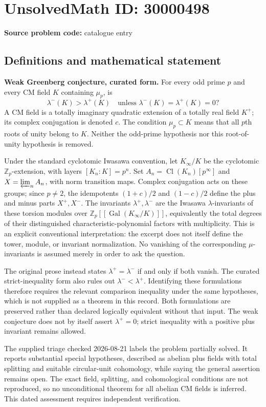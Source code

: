\documentclass[11pt]{article}
\newcommand{\Z}{\mathbb{Z}}
\begin{document}
\section*{UnsolvedMath ID: 30000498}
\textbf{Source problem code:} catalogue entry
\subsection{Definitions and mathematical statement}
\textbf{Weak Greenberg conjecture, curated form.} For every odd prime \(p\) and every CM field \(K\) containing \(\mu_p\), is\[\lambda^-(K)>\lambda^+(K)\quad\text{unless }\lambda^-(K)=\lambda^+(K)=0?\] A CM field is a totally imaginary quadratic extension of a totally real field \(K^+\); its complex conjugation is denoted \(c\). The condition \(\mu_p\subset K\) means that all \(p\)th roots of unity belong to \(K\). Neither the odd-prime hypothesis nor this root-of-unity hypothesis is removed.\par Under the standard cyclotomic Iwasawa convention, let \(K_\infty/K\) be the cyclotomic \(\Z_p\)-extension, with layers \([K_n:K]=p^n\). Set \(A_n=\operatorname{Cl}(K_n)[p^\infty]\) and \(X=\varprojlim_n A_n\), with norm transition maps. Complex conjugation acts on these groups; since \(p\ne2\), the idempotents \((1+c)/2\) and \((1-c)/2\) define the plus and minus parts \(X^+,X^-\). The invariants \(\lambda^+,\lambda^-\) are the Iwasawa \(\lambda\)-invariants of these torsion modules over \(\Z_p[[\operatorname{Gal}(K_\infty/K)]]\), equivalently the total degrees of their distinguished characteristic-polynomial factors with multiplicity. This is an explicit conventional interpretation: the excerpt does not itself define the tower, module, or invariant normalization. No vanishing of the corresponding \(\mu\)-invariants is assumed merely in order to ask the question.\par The original prose instead states \(\lambda^+=\lambda^-\) if and only if both vanish. The curated strict-inequality form also rules out \(\lambda^-<\lambda^+\). Identifying these formulations therefore requires the relevant comparison inequality under the same hypotheses, which is not supplied as a theorem in this record. Both formulations are preserved rather than declared logically equivalent without that input. The weak conjecture does not by itself assert \(\lambda^+=0\); strict inequality with a positive plus invariant remains allowed.\par The supplied triage checked 2026-08-21 labels the problem partially solved. It reports substantial special hypotheses, described as abelian plus fields with total splitting and suitable circular-unit cohomology, while saying the general assertion remains open. The exact field, splitting, and cohomological conditions are not reproduced, so no unconditional theorem for all abelian CM fields is inferred. This dated assessment requires independent verification.
\end{document}
